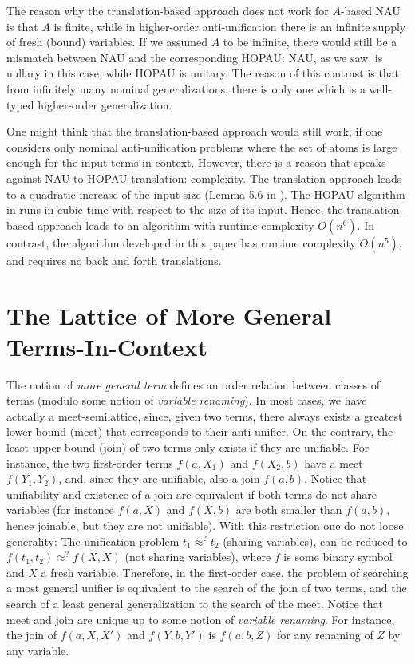 \documentclass{llncs}
\begin{document}
The reason why the translation-based approach does not work for
$A$-based NAU is that $A$ is finite, while in higher-order
anti-unification there is an infinite supply of fresh (bound)
variables. 
If we assumed $A$ to be infinite, there would still be a mismatch between
NAU and the corresponding HOPAU: NAU, as we saw, is nullary in this
case, while HOPAU is unitary. The reason of this contrast is that from
infinitely many nominal generalizations, there is only one which is a
well-typed higher-order generalization.



One might think that the translation-based approach would still work,
if one considers only nominal anti-unification problems where the set
of atoms is large enough for the input
terms-in-context.  However, there
is a reason that speaks against NAU-to-HOPAU translation:
complexity. The translation approach leads to a quadratic increase of
the input size (Lemma 5.6 in \cite{DBLP:journals/tocl/LevyV12}). The
HOPAU algorithm in \cite{DBLP:conf/rta/BaumgartnerKLV13} runs in cubic
time  with respect to the size of its
input. Hence, the translation-based approach leads to an algorithm
with runtime complexity $O(n^6)$. In
contrast, the algorithm developed in this paper has runtime complexity
$O(n^5)$, and requires no back and forth
translations.


\section{The Lattice of More General Terms-In-Context}
\label{sect:lattice}

The notion of \emph{more general term} defines an order relation
between classes of terms (modulo some notion of \emph{variable
  renaming}). In most cases, we have actually a meet-semilattice,
since, given two terms, there always exists a greatest lower bound
(meet) that corresponds to their anti-unifier. On the contrary, the
least upper bound (join) of two terms only exists if they are
unifiable. For instance, the two first-order terms $f(a,X_1)$ and
$f(X_2,b)$ have a meet $f(Y_1,Y_2)$, and, since they are unifiable,
also a join $f(a,b)$. Notice that unifiability and existence of a join
are equivalent if both terms do not share variables (for instance
$f(a,X)$ and $f(X,b)$ are both smaller than $f(a,b)$, hence joinable,
but they are not unifiable). With this restriction one do not loose
generality: The unification problem $t_1\approx^? t_2$ (sharing variables),
can be reduced to $f(t_1,t_2) \approx^?  f(X,X)$ (not sharing variables), where $f$
is some binary symbol and $X$ a fresh variable.  Therefore, in the
first-order case, the problem of searching a most general unifier is
equivalent to the search of the join of two terms, and the search of a
least general generalization %
to the search of the meet. Notice that meet
and join are unique up to some notion of \emph{variable renaming}.
For instance, the join of $f(a,X,X')$ and $f(Y,b,Y')$ is $f(a,b,Z)$
for any renaming of $Z$ by any variable.
\end{document}
